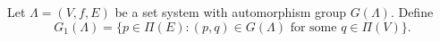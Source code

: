 Let $\Lambda = (V, f, E)$ be a set system with automorphism group $G(\Lambda)$. Define
$$G_1(\Lambda) = \{p \in \Pi(E) : (p, q) \in G(\Lambda) \text{ for some } q \in \Pi(V)\}.$$
